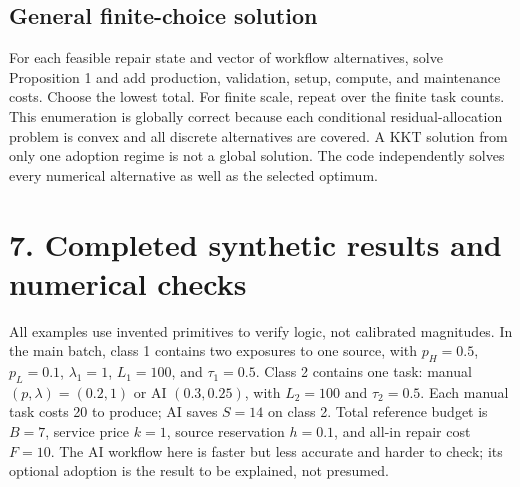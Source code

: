\documentclass[
  11pt,
  a4paper,
]{article}
\begin{document}
\hypertarget{general-finite-choice-solution}{%
\subsection{General finite-choice
solution}\label{general-finite-choice-solution}}

For each feasible repair state and vector of workflow alternatives,
solve Proposition 1 and add production, validation, setup, compute, and
maintenance costs. Choose the lowest total. For finite scale, repeat
over the finite task counts. This enumeration is globally correct
because each conditional residual-allocation problem is convex and all
discrete alternatives are covered. A KKT solution from only one adoption
regime is not a global solution. The code independently solves every
numerical alternative as well as the selected optimum.

\hypertarget{completed-synthetic-results-and-numerical-checks}{%
\section{7. Completed synthetic results and numerical
checks}\label{completed-synthetic-results-and-numerical-checks}}

All examples use invented primitives to verify logic, not calibrated
magnitudes. In the main batch, class 1 contains two exposures to one
source, with \(p_H=0.5\), \(p_L=0.1\), \(\lambda_1=1\), \(L_1=100\), and
\(\tau_1=0.5\). Class 2 contains one task: manual
\((p,\lambda)=(0.2,1)\) or AI \((0.3,0.25)\), with \(L_2=100\) and
\(\tau_2=0.5\). Each manual task costs 20 to produce; AI saves \(S=14\)
on class 2. Total reference budget is \(B=7\), service price \(k=1\),
source reservation \(h=0.1\), and all-in repair cost \(F=10\). The AI
workflow here is faster but less accurate and harder to check; its
optional adoption is the result to be explained, not presumed.

\newpage
\end{document}

